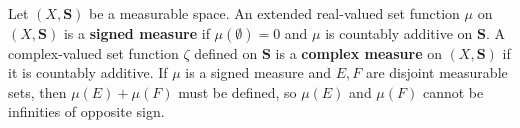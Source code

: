 Let $(X, \mathbf{S})$ be a measurable space. An extended real-valued set function $\mu$ on $(X, \mathbf{S})$ is a \textbf{signed measure} if $\mu(\emptyset) = 0$ and $\mu$ is countably additive on $\mathbf{S}$. A complex-valued set function $\zeta$ defined on $\mathbf{S}$ is a \textbf{complex measure} on $(X, \mathbf{S})$ if it is countably additive. If $\mu$ is a signed measure and $E, F$ are disjoint measurable sets, then $\mu(E) + \mu(F)$ must be defined, so $\mu(E)$ and $\mu(F)$ cannot be infinities of opposite sign.

